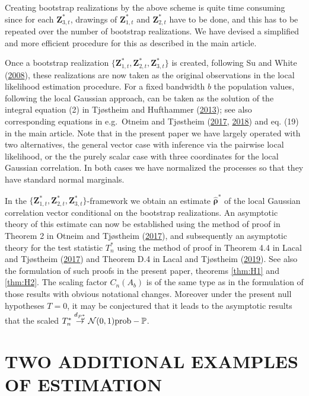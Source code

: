 \documentclass[
  12pt,
  letterpaper]{article}
\numberwithin{equation}{section}
\newcommand{\Z}{\bm{Z}}
\newcommand{\hfrho}{\widehat{\bm{\rho}}}
\begin{document}
Creating bootstrap realizations by the above scheme is quite time consuming since
for each \(\Z_{3,t}^*\), drawings of \(\Z_{1,t}^*\) and \(\Z_{2,t}^*\) have to be done, and this has to be repeated over the number of bootstrap realizations. We have devised a simplified and more efficient procedure for this as described in the main article.

Once a bootstrap realization \(\{\Z_{1,t}^*,\Z_{2,t}^*,\Z_{3,t}^*\}\) is created, following Su and White (\protect\hyperlink{ref-su2008nonparametric}{2008}), these realizations are now taken as the original observations in the local likelihood estimation procedure. For a fixed bandwidth \(b\) the population values, following the local Gaussian approach, can be taken as the solution of the integral equation (2) in Tjøstheim and Hufthammer (\protect\hyperlink{ref-tjostheim2013local}{2013}); see also corresponding equations in e.g.~Otneim and Tjøstheim (\protect\hyperlink{ref-otneim2017locally}{2017}, \protect\hyperlink{ref-otneim2017conditional}{2018}) and eq. (19) in the main article. Note that in the present paper we have largely operated with two alternatives, the general vector case with inference via the pairwise local likelihood, or the the purely scalar case with three coordinates for the local Gaussian correlation. In both cases we have normalized the processes so that they have standard normal marginals.

In the \(\{\Z_{1,t}^*,\Z_{2,t}^*,\Z_{3,t}^*\}\)-framework we obtain an estimate \(\hfrho^*\) of the local Gaussian correlation vector conditional on the bootstrap realizations. An asymptotic theory of this estimate can now be established using the method of proof in Theorem 2 in Otneim and Tjøstheim (\protect\hyperlink{ref-otneim2017locally}{2017}), and subsequently an asymptotic theory for the test statistic \(T_n^*\) using the method of proof in Theorem 4.4 in Lacal and Tjøstheim (\protect\hyperlink{ref-lacal2017local}{2017}) and Theorem D.4 in Lacal and Tjøstheim (\protect\hyperlink{ref-lacal2018estimating}{2019}). See also the formulation of such proofs in the present paper, theorems \ref{thm:H1} and \ref{thm:H2}. The scaling factor \(C_n(A_b)\) is of the same type as in the formulation of those results with obvious notational changes. Moreover under the present null hypotheses \(T = 0\), it may be conjectured that it leads to the asymptotic results that the scaled \(T_n^* \buildrel {d_{P^*_{\omega}}} \over {\to} {\cal N}(0,1)\mbox{prob}-\mathbb{P}\).

\hypertarget{examples}{%
\section{TWO ADDITIONAL EXAMPLES OF ESTIMATION}\label{examples}}
\end{document}

